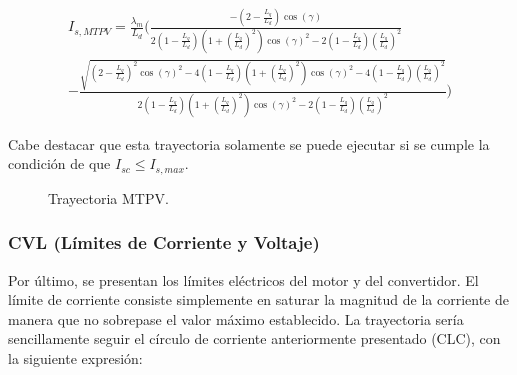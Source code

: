 \begin{equation}
\begin{split}
I_{s,MTPV} = \frac{\lambda_m}{L_d} ( \frac{-(2 - \frac{L_q}{L_d}) \cos(\gamma)}{2(1 - \frac{L_q}{L_d})(1 + (\frac{L_q}{L_d})^2) \cos(\gamma)^2 - 2(1 - \frac{L_q}{L_d}) (\frac{L_q}{L_d})^2}\\
-\frac{\sqrt{(2 - \frac{L_q}{L_d})^2 \cos(\gamma)^2 - 4(1 - \frac{L_q}{L_d})(1 + (\frac{L_q}{L_d})^2) \cos(\gamma)^2 - 4(1 - \frac{L_q}{L_d}) (\frac{L_q}{L_d})^2}}{2(1 - \frac{L_q}{L_d})(1 + (\frac{L_q}{L_d})^2) \cos(\gamma)^2 - 2(1 - \frac{L_q}{L_d}) (\frac{L_q}{L_d})^2} )
\end{split}
\end{equation}




Cabe destacar que esta trayectoria solamente se puede ejecutar si se cumple la condición de que $I_{sc} \leq I_{s,max}$.


\begin{figure}[H]
  \centering
  \caption{Trayectoria MTPV.}
\end{figure}



\subsubsection{CVL (Límites de Corriente y Voltaje)}

Por último, se presentan los límites eléctricos del motor y del convertidor. El límite de corriente consiste simplemente en saturar la magnitud de la corriente de manera que no sobrepase el valor máximo establecido. La trayectoria sería sencillamente seguir el círculo de corriente anteriormente presentado (CLC), con la siguiente expresión:

